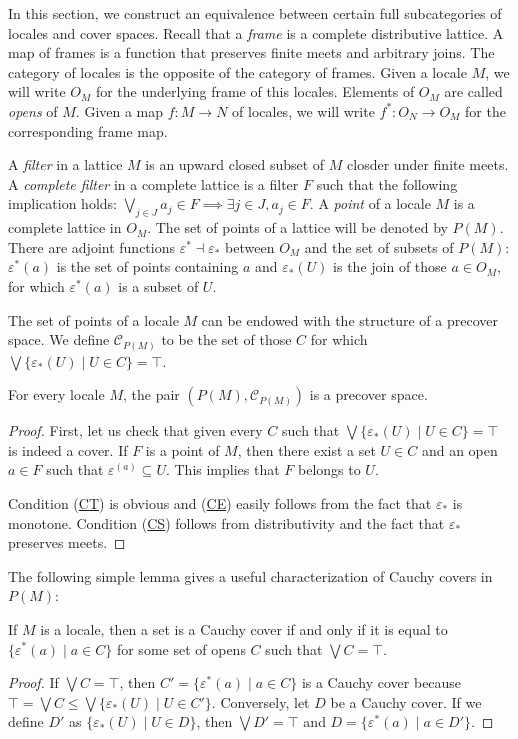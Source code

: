 \documentclass[reqno]{amsart}
\newcommand{\axref}[1]{(\hyperref[ax:#1]{#1})}
\theoremstyle{definition}
\theoremstyle{remark}
\numberwithin{figure}{section}
\begin{document}
In this section, we construct an equivalence between certain full subcategories of locales and cover spaces.
Recall that a \emph{frame} is a complete distributive lattice.
A map of frames is a function that preserves finite meets and arbitrary joins.
The category of locales is the opposite of the category of frames.
Given a locale $M$, we will write $O_M$ for the underlying frame of this locales.
Elements of $O_M$ are called \emph{opens} of $M$.
Given a map $f : M \to N$ of locales, we will write $f^* : O_N \to O_M$ for the corresponding frame map.

A \emph{filter} in a lattice $M$ is an upward closed subset of $M$ closder under finite meets.
A \emph{complete filter} in a complete lattice is a filter $F$ such that the following implication holds: $\bigvee_{j \in J} a_j \in F \implies \exists j \in J, a_j \in F$.
A \emph{point} of a locale $M$ is a complete lattice in $O_M$.
The set of points of a lattice will be denoted by $P(M)$.
There are adjoint functions $\varepsilon^* \dashv \varepsilon_*$ between $O_M$ and the set of subsets of $P(M)$:
$\varepsilon^*(a)$ is the set of points containing $a$ and $\varepsilon_*(U)$ is the join of those $a \in O_M$, for which $\varepsilon^*(a)$ is a subset of $U$.

The set of points of a locale $M$ can be endowed with the structure of a precover space.
We define $\mathcal{C}_{P(M)}$ to be the set of those $C$ for which $\bigvee \{ \varepsilon_*(U) \mid U \in C \} = \top$.

\begin{prop}
For every locale $M$, the pair $(P(M),\mathcal{C}_{P(M)})$ is a precover space.
\end{prop}
\begin{proof}
First, let us check that given every $C$ such that $\bigvee \{ \varepsilon_*(U) \mid U \in C \} = \top$ is indeed a cover.
If $F$ is a point of $M$, then there exist a set $U \in C$ and an open $a \in F$ such that $\varepsilon^(a) \subseteq U$.
This implies that $F$ belongs to $U$.

Condition \axref{CT} is obvious and \axref{CE} easily follows from the fact that $\varepsilon_*$ is monotone.
Condition \axref{CS} follows from distributivity and the fact that $\varepsilon_*$ preserves meets.
\end{proof}

The following simple lemma gives a useful characterization of Cauchy covers in $P(M)$:

\begin{lem}
If $M$ is a locale, then a set is a Cauchy cover if and only if it is equal to $\{ \varepsilon^*(a) \mid a \in C \}$ for some set of opens $C$ such that $\bigvee C = \top$.
\end{lem}
\begin{proof}
If $\bigvee C = \top$, then $C' = \{ \varepsilon^*(a) \mid a \in C \}$ is a Cauchy cover because $\top = \bigvee C \leq \bigvee \{ \varepsilon_*(U) \mid U \in C' \}$.
Conversely, let $D$ be a Cauchy cover.
If we define $D'$ as $\{ \varepsilon_*(U) \mid U \in D \}$, then $\bigvee D' = \top$ and $D = \{ \varepsilon^*(a) \mid a \in D' \}$.
\end{proof}
\end{document}
